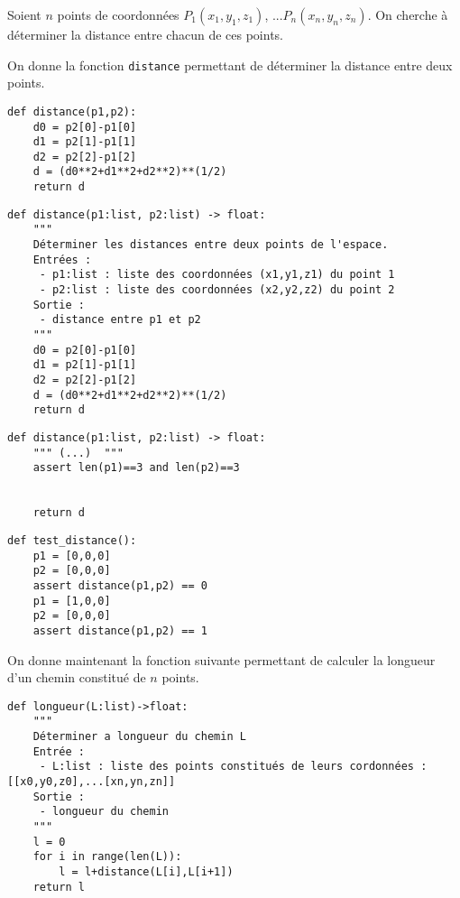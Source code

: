 
Soient $n$ points de coordonnées $P_1(x_1,y_1,z_1)$,  ...$P_n(x_n,y_n,z_n)$. On cherche à déterminer la distance entre chacun de ces points.

On donne la fonction \texttt{distance} permettant de déterminer la distance entre deux points. 

\begin{lstlisting}
def distance(p1,p2):
    d0 = p2[0]-p1[0]
    d1 = p2[1]-p1[1]
    d2 = p2[2]-p1[2]
    d = (d0**2+d1**2+d2**2)**(1/2)
    return d
\end{lstlisting}


\ifprof
\begin{lstlisting}
def distance(p1:list, p2:list) -> float:
    """
    Déterminer les distances entre deux points de l'espace. 
    Entrées : 
     - p1:list : liste des coordonnées (x1,y1,z1) du point 1
     - p2:list : liste des coordonnées (x2,y2,z2) du point 2
    Sortie :
     - distance entre p1 et p2
    """
    d0 = p2[0]-p1[0]
    d1 = p2[1]-p1[1]
    d2 = p2[2]-p1[2]
    d = (d0**2+d1**2+d2**2)**(1/2)
    return d
\end{lstlisting}
\else
\fi

\ifprof
\begin{lstlisting}
def distance(p1:list, p2:list) -> float:
    """ (...)  """
    assert len(p1)==3 and len(p2)==3

    
    return d
\end{lstlisting}

\else
\fi


\ifprof
\begin{lstlisting}
def test_distance():
    p1 = [0,0,0]
    p2 = [0,0,0]
    assert distance(p1,p2) == 0
    p1 = [1,0,0]
    p2 = [0,0,0]
    assert distance(p1,p2) == 1
\end{lstlisting}

\else
\fi

On donne maintenant la fonction suivante permettant de calculer la longueur d'un chemin constitué de $n$ points. 
\begin{lstlisting}
def longueur(L:list)->float:
    """
    Déterminer a longueur du chemin L
    Entrée : 
     - L:list : liste des points constitués de leurs cordonnées : [[x0,y0,z0],...[xn,yn,zn]]
    Sortie :
     - longueur du chemin
    """
    l = 0
    for i in range(len(L)):
        l = l+distance(L[i],L[i+1])
    return l
\end{lstlisting}

